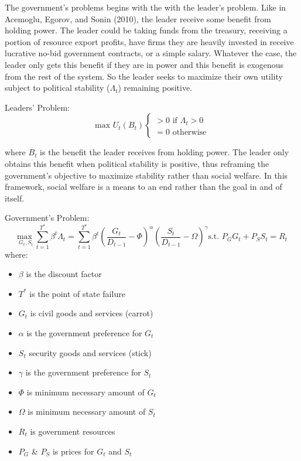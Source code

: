 \documentclass[12pt]{article}
\begin{document}
\begin{spacing}{1.5}
The government's problems begins with the with the leader's problem. Like in Acemoglu,  Egorov, and Sonin (2010), the leader receive some benefit from holding power. The leader could be taking funds from the treasury, receiving a portion of resource export profits, have firms they are heavily invested in receive lucrative no-bid government contracts, or a simple salary. Whatever the case, the leader only gets this benefit if they are in power and this benefit is exogenous from the rest of the system. So the leader seeks to maximize their own utility subject to political stability ($\Lambda_t$) remaining positive. 


\vspace{.5 em}
\noindent Leaders' Problem:
\begin{equation}
	 \text{max } U_t(B_t) \begin{cases}
		>0 \text{ if } \Lambda_t > 0 \\
		= 0 \text{ otherwise} 	
	\end{cases}
\end{equation} 

\noindent where $B_t$ is the benefit the leader receives from holding power. The leader only obtains this benefit when political stability is positive, thus reframing the government's objective to maximize stability rather than social welfare. In this framework, social welfare is a means to an end rather than the goal in and of itself. 

\vspace{.5 em}

\noindent Government's Problem:
\begin{equation}
{\underset{G_t,S_t}{\text{max }}} \sum\limits_{t=1}^{T^*} \beta^t {\Lambda}_t = \sum\limits_{t=1}^{T^*} \beta^t\left(\frac{G_t}{D_{t-1}}-\Phi\right)^\alpha \left(\frac{S_t}{D_{t-1}}-\Omega\right)^\gamma   \text{s.t. } P_G G_t+P_S S_t=R_t
\end{equation}
\noindent where:
\begin{itemize}
	\item $\beta$ is the discount factor 
	\item $T^*$ is the point of state failure 
	\item $G_t$ is civil goods and services (carrot) 
	\item $\alpha$ is the government preference for $G_t$ 
	\item $S_t$ security goods and services (stick)
	\item $\gamma$ is the government preference for $S_t$ 
	\item $\Phi$ is minimum necessary amount of $G_t$
	\item $\Omega$ is minimum necessary amount of $S_t$ 
	\item $R_t$	is government resources
	\item $P_G$ \& $P_S$ is prices for $G_t$ and $S_t$ 
\end{itemize}


\end{spacing}
\end{document}
